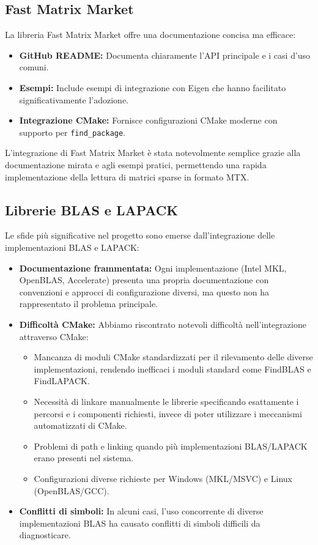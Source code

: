 \subsection{Fast Matrix Market}

La libreria Fast Matrix Market offre una documentazione concisa ma efficace:

\begin{itemize}
    \item \textbf{GitHub README:} Documenta chiaramente l'API principale e i casi d'uso comuni.
    \item \textbf{Esempi:} Include esempi di integrazione con Eigen che hanno facilitato significativamente l'adozione.
    \item \textbf{Integrazione CMake:} Fornisce configurazioni CMake moderne con supporto per \texttt{find\_package}.
\end{itemize}

L'integrazione di Fast Matrix Market è stata notevolmente semplice grazie alla documentazione mirata e agli esempi pratici, 
permettendo una rapida implementazione della lettura di matrici sparse in formato MTX.

\subsection{Librerie BLAS e LAPACK}

Le sfide più significative nel progetto sono emerse dall'integrazione delle implementazioni BLAS e LAPACK:

\begin{itemize}
    \item \textbf{Documentazione frammentata:} Ogni implementazione (Intel MKL, OpenBLAS, Accelerate) presenta una propria documentazione con convenzioni e approcci di configurazione diversi, ma questo non ha rappresentato il problema principale.
    
    \item \textbf{Difficoltà CMake:} Abbiamo riscontrato notevoli difficoltà nell'integrazione attraverso CMake:
    \begin{itemize}
        \item Mancanza di moduli CMake standardizzati per il rilevamento delle diverse implementazioni, rendendo inefficaci i moduli standard come FindBLAS e FindLAPACK.
        \item Necessità di linkare manualmente le librerie specificando esattamente i percorsi e i componenti richiesti, invece di poter utilizzare i meccanismi automatizzati di CMake.
        \item Problemi di path e linking quando più implementazioni BLAS/LAPACK erano presenti nel sistema.
        \item Configurazioni diverse richieste per Windows (MKL/MSVC) e Linux (OpenBLAS/GCC).
    \end{itemize}
    
    \item \textbf{Conflitti di simboli:} In alcuni casi, l'uso concorrente di diverse implementazioni BLAS ha causato conflitti di simboli difficili da diagnosticare.
\end{itemize}

